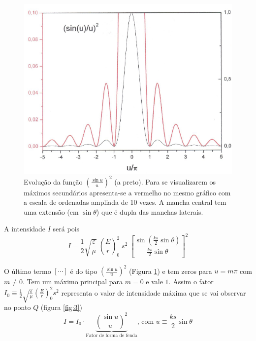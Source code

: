 \documentclass[a4paper,12pt]{article}
\begin{document}
\begin{figure}[htb]  \centering 
	\includegraphics[width=0.7
	\textwidth]{figura4.png} \caption{
	Evolução da função $\left( \frac{\sin u}{u} \right)^2 $ (a preto). Para se visualizarem os máximos secundários apresenta-se a vermelho no mesmo gráfico com a escala de ordenadas ampliada de 10 vezes.
A mancha central tem uma extensão (em $\sin \theta$) que é dupla das manchas laterais. \label{fig:4}} 
\end{figure}

A intensidade $I$ será pois
\begin{equation}
	\label{eq:31} I = \frac{1}{2}\sqrt{\frac{ \varepsilon}{\mu}} \; \left( \frac{E}{r} \right)_0^2 \; s^2 \; \left[ \frac{ \sin( \frac{k s}{2}\sin \theta)}{ \frac{k s}{2}\sin \theta} \right]^2 
\end{equation}

O último termo $\left[ \cdots \right] $  é do tipo $(\frac{\sin u}{u})^2 $ (Figura \ref{fig:4}) e tem zeros para $u = m \pi$ com $m \neq 0$. Tem um máximo principal para $m = 0$ e vale $1$. Assim o fator $I_0 \equiv \frac{1}{2} \sqrt{\frac{ \varepsilon}{\mu}} (\frac{E}{r })_0^2 s^2$ representa o valor de intensidade máxima que se vai observar no ponto $Q$ (figura \ref{fig:3})
\begin{equation}
	\label{eq:32} I = I_0 \cdot \underbrace{\left( \frac{\sin u}{u} \right)^2}_\text{Fator de forma de fenda} \text{, com } u\equiv \frac{k s}{2}\sin \theta 
\end{equation}
\end{document}
